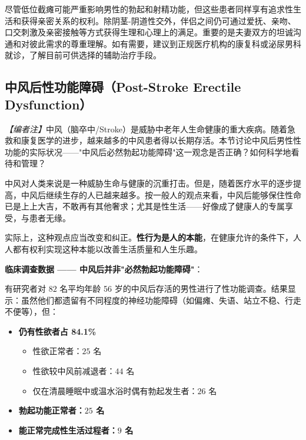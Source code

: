 \begin{tcolorbox}[colback=pink!5!white,colframe=red!50!black,title=贴心小叮咛]
尽管低位截瘫可能严重影响男性的勃起和射精功能，但这些患者同样享有追求性生活和获得亲密关系的权利。除阴茎-阴道性交外，伴侣之间仍可通过爱抚、亲吻、口交刺激及亲密接触等方式获得生理和心理上的满足。重要的是夫妻双方的坦诚沟通和对彼此需求的尊重理解。如有需要，建议到正规医疗机构的康复科或泌尿男科就诊，了解目前可供选择的辅助治疗手段。
\end{tcolorbox}

\subsection{中风后性功能障碍（Post-Stroke Erectile Dysfunction）}

\noindent\textit{【编者注】}中风（脑卒中/Stroke）是威胁中老年人生命健康的重大疾病。随着急救和康复医学的进步，越来越多的中风患者得以长期存活。本节讨论中风后男性性功能的实际状况——"中风后必然勃起功能障碍"这一观念是否正确？如何科学地看待和管理？

\vspace{0.5em}
中风对人类来说是一种威胁生命与健康的沉重打击。但是，随着医疗水平的逐步提高，中风后继续生存的人已越来越多。按一般人的观点来看，中风后能够保住性命已是上上大吉，不敢再有其他奢求；尤其是性生活——好像成了健康人的专属享受，与患者无缘。

实际上，这种观点应当改变和纠正。\textbf{性行为是人的本能}，在健康允许的条件下，人人都有权利实现这种本能以改善生活质量和人生乐趣。

\vspace{0.5em}
\noindent\textbf{临床调查数据 —— 中风后并非"必然勃起功能障碍"}：

有研究者对 $82$ 名平均年龄 56 岁的中风后存活的男性进行了性功能调查。结果显示：虽然他们都遗留有不同程度的神经功能障碍（如偏瘫、失语、站立不稳、行走不便等），但：
\begin{itemize}
	\item \textbf{仍有性欲者占 84.1\%}
	\begin{itemize}
		\item 性欲正常者：$25$ 名
		\item 性欲较中风前减退者：$44$ 名
		\item 仅在清晨睡眠中或温水浴时偶有勃起发生者：$26$ 名
	\end{itemize}
	\item \textbf{勃起功能正常者：$25$ 名}
	\item \textbf{能正常完成性生活过程者：$9$ 名}
\end{itemize}

